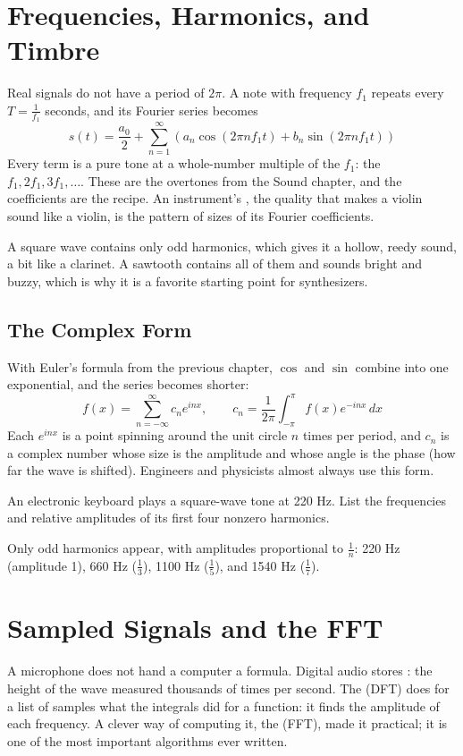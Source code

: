 \section{Frequencies, Harmonics, and Timbre}
Real signals do not have a period of $2\pi$. A note with frequency $f_1$ repeats every
$T = \frac{1}{f_1}$ seconds, and its Fourier series becomes
$$s(t) = \frac{a_0}{2} + \sum_{n=1}^{\infty}\left(a_n\cos(2\pi n f_1 t) + b_n\sin(2\pi n f_1 t)\right)$$
Every term is a pure tone at a whole-number multiple of the  $f_1$: the  $f_1, 2f_1, 3f_1, \dots$. These are the
overtones from the Sound chapter, and the coefficients are the recipe. An
instrument's , the quality that makes a violin sound like a violin,
is the pattern of sizes of its Fourier coefficients.

A square wave contains only odd harmonics, which gives it a hollow, reedy sound,
a bit like a clarinet. A sawtooth contains all of them and sounds bright and
buzzy, which is why it is a favorite starting point for synthesizers.

\subsection{The Complex Form}
With Euler's formula from the previous chapter, $\cos$ and $\sin$ combine into one
exponential, and the series becomes shorter:
$$f(x) = \sum_{n=-\infty}^{\infty} c_n e^{inx}, \qquad c_n = \frac{1}{2\pi}\int_{-\pi}^{\pi} f(x)e^{-inx}\,dx$$
Each $e^{inx}$ is a point spinning around the unit circle $n$ times per period, and
$c_n$ is a complex number whose size is the amplitude and whose angle is the phase
(how far the wave is shifted). Engineers and physicists almost always use this form.

\begin{Exercise}[title={Harmonics of a Square Wave}, label=fs_harm]
An electronic keyboard plays a square-wave tone at 220 Hz. List the frequencies and
relative amplitudes of its first four nonzero harmonics.
\end{Exercise}
\begin{Answer}[ref=fs_harm]
Only odd harmonics appear, with amplitudes proportional to $\frac{1}{n}$: 220 Hz
(amplitude 1), 660 Hz ($\frac{1}{3}$), 1100 Hz ($\frac{1}{5}$), and 1540 Hz ($\frac{1}{7}$).
\end{Answer}

\section{Sampled Signals and the FFT}
A microphone does not hand a computer a formula. Digital audio stores
: the height of the wave measured thousands of times per second. The
 (DFT) does for a list of samples what the
integrals did for a function: it finds the amplitude of each frequency. A clever way
of computing it, the  (FFT), made it practical; it is
one of the most important algorithms ever written.

